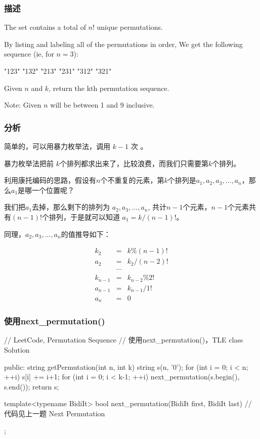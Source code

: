 \subsubsection{描述}
The set \fn{[1,2,3,…,n]} contains a total of $n!$ unique permutations.

By listing and labeling all of the permutations in order,
We get the following sequence (ie, for $n = 3$):
\begin{Code}
"123"
"132"
"213"
"231"
"312"
"321"
\end{Code}

Given $n$ and $k$, return the kth permutation sequence.

Note: Given $n$ will be between 1 and 9 inclusive.


\subsubsection{分析}
简单的，可以用暴力枚举法，调用 $k-1$ 次 。

暴力枚举法把前 $k$个排列都求出来了，比较浪费，而我们只需要第$k$个排列。

利用康托编码的思路，假设有$n$个不重复的元素，第$k$个排列是$a_1, a_2, a_3, ..., a_n$，那么$a_1$是哪一个位置呢？

我们把$a_1$去掉，那么剩下的排列为
$a_2, a_3, ..., a_n$, 共计$n-1$个元素，$n-1$个元素共有$(n-1)!$个排列，于是就可以知道 $a_1 = k / (n-1)!$。

同理，$a_2, a_3, ..., a_n$的值推导如下：

\begin{eqnarray}
k_2 &=& k\%(n-1)! \nonumber \\
a_2 &=& k_2/(n-2)! \nonumber \\
\quad & \cdots \nonumber \\
k_{n-1} &=& k_{n-2}\%2! \nonumber \\
a_{n-1} &=& k_{n-1}/1! \nonumber \\
a_n &=& 0 \nonumber
\end{eqnarray}


\subsubsection{使用next_permutation()}
\begin{Code}
// LeetCode, Permutation Sequence
// 使用next_permutation()，TLE
class Solution {
public:
    string getPermutation(int n, int k) {
        string s(n, '0');
        for (int i = 0; i < n; ++i)
            s[i] += i+1;
        for (int i = 0; i < k-1; ++i)
            next_permutation(s.begin(), s.end());
        return s;
    }

    template<typename BidiIt>
    bool next_permutation(BidiIt first, BidiIt last) {
        // 代码见上一题 Next Permutation
    }
};
\end{Code}


